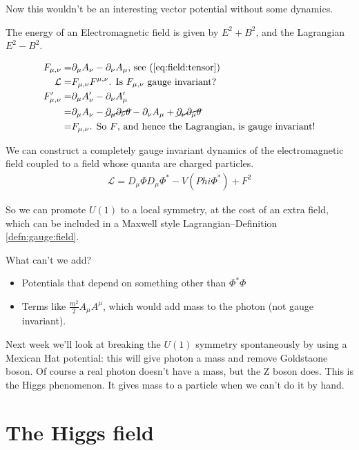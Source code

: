 \documentclass[]{article}
\begin{document}
Now this wouldn't be an interesting vector potential without some dynamics.

The energy of an Electromagnetic field is given by $E^2 + B^2$, and the Lagrangian $E^2-B^2$.

\begin{align*} 
	F_{\mu,\nu} =& \partial_\mu A_\nu - \partial_\nu A_\mu \text{, see (\ref{eq:field:tensor})}\\
	\mathcal{L} =& F_{\mu,\nu} F^{\mu,\nu} \text{. Is $F_{\mu,\nu}$ gauge invariant? }\\
	F_{\mu,\nu}^\prime =&\partial_\mu A_\nu^\prime - \partial_\nu A_\mu^\prime\\
	=& \partial_\mu A_\nu - \cancel{\partial_\mu \partial_\nu \theta}-\partial_\nu A_\mu + \cancel{\partial_\nu \partial_\mu \theta}\\
	=& 	F_{\mu,\nu} \text{. So $F$, and hence the Lagrangian, is gauge invariant!}
\end{align*}

We can construct a completely gauge invariant dynamics of the electromagnetic field coupled to a field whose quanta are charged particles.
\begin{align*}
	\mathcal{L} = D_\mu \Phi D_\mu \Phi^* -V(Phi\Phi^*) + F^2
\end{align*}

So we can promote $U(1)$ to a local symmetry, at the cost of an extra field, which can be included in a Maxwell style Lagrangian--Definition \ref{defn:gauge:field}.

What can't we add?

\begin{itemize}
	\item Potentials that depend on something other than $\Phi^*\Phi$ 
	\item Terms like $\frac{m^2}{2}A_\mu A^\mu$, which would add mass to the photon (not gauge invariant).
\end{itemize}

Next week we'll look at breaking the $U(1)$ symmetry spontaneously by using a Mexican Hat potential: this will give photon a mass and remove Goldstaone boson. Of course a real photon doesn't have a mass, but the Z boson does. This is the Higgs phenomenon. It gives mass to a particle when we can't do it by hand.

\section{The Higgs field}
\end{document}
